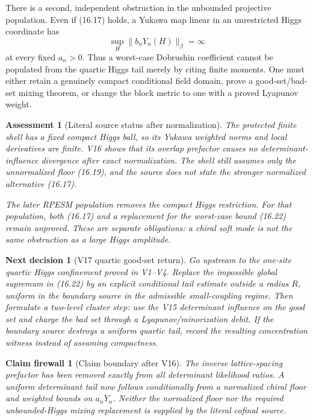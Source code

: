 \documentclass[11pt]{article}
\newtheorem{firewall}[theorem]{Claim firewall}
\newtheorem{decision}[theorem]{Next decision}
\newtheorem{assessment}[theorem]{Assessment}
\theoremstyle{remark}
\begin{document}
There is a second, independent obstruction in the unbounded
projective population.  Even if (16.17) holds, a Yukawa map linear
in an unrestricted Higgs coordinate has
\[
 \sup_H\|b_nY_n(H)\|_\beta=\infty                            \tag{16.22}
\]
at every fixed \(a_n>0\).  Thus a worst-case Dobrushin coefficient
cannot be populated from the quartic Higgs tail merely by citing
finite moments.  One must either retain a genuinely compact
conditional field domain, prove a good-set/bad-set mixing theorem,
or change the block metric to one with a proved Lyapunov weight.

\begin{assessment}[Literal source status after normalization]
\label{ass:v15v16-source}
The protected finite shell has a fixed compact Higgs ball, so its
Yukawa weighted norms and local derivatives are finite.  V16 shows
that its overlap prefactor causes no determinant-influence
divergence after exact normalization.  The shell still assumes only
the unnormalized floor (16.19), and the source does not state the
stronger normalized alternative (16.17).

The later RPESM population removes the compact Higgs restriction.
For that population, both (16.17) and a replacement for the
worst-case bound (16.22) remain unproved.  These are separate
obligations: a chiral soft mode is not the same obstruction as a
large Higgs amplitude.
\end{assessment}

\begin{decision}[V17 quartic good-set return]
\label{dec:v15v16-next}
Go upstream to the one-site quartic Higgs confinement proved in
V1--V4.  Replace the impossible global supremum in (16.22) by an
explicit conditional tail estimate outside a radius \(R\), uniform
in the boundary source in the admissible small-coupling regime.
Then formulate a two-level cluster step: use the V15 determinant
influence on the good set and charge the bad set through a
Lyapunov/minorization debit.  If the boundary source destroys a
uniform quartic tail, record the resulting concentration witness
instead of assuming compactness.
\end{decision}

\begin{firewall}[Claim boundary after V16]
\label{fire:v15v16}
The inverse lattice-spacing prefactor has been removed exactly from
all determinant likelihood ratios.  A uniform determinant tail now
follows conditionally from a normalized chiral floor and weighted
bounds on \(a_nY_n\).  Neither the normalized floor nor the required
unbounded-Higgs mixing replacement is supplied by the literal
cofinal source.
\end{firewall}
\end{document}
